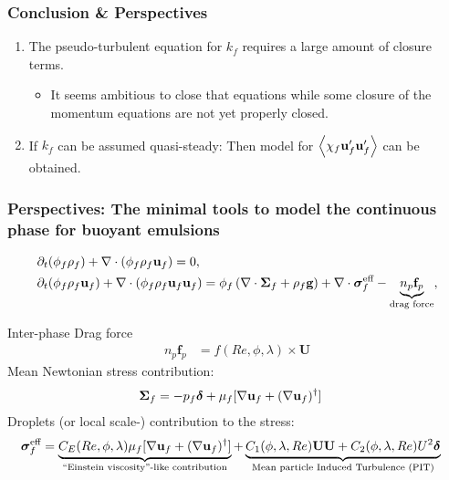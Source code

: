 \documentclass{sintefbeamer}
\begin{document}
\begin{frame}
  \frametitle{Conclusion \& Perspectives}

  \begin{enumerate}
    \item The pseudo-turbulent equation for $k_f$ requires a large amount of closure terms. 
    \begin{itemize}
      \item 
      It seems ambitious to close that equations while some closure of the momentum equations are not yet properly closed. 
    \end{itemize}
    \item If $k_f$ can be assumed quasi-steady: Then model for $\left<\chi_f\textbf{u}_f'\textbf{u}_f'\right>$ can be obtained. 
  \end{enumerate}

\end{frame}

\begin{frame}
  \frametitle{Perspectives: The minimal tools to model the continuous phase for buoyant emulsions}


  \begin{align*}
    &\partial_t (\phi_f \rho_f)  
    + \mathbf{\nabla}\cdot (
        \phi_f \rho_f\textbf{u}_f
    )
    = 
    0,\\
    &\partial_t (\phi_f\rho_f \textbf{u}_f)
    + \mathbf{\nabla}\cdot (\phi_f\rho_f \textbf{u}_f\textbf{u}_f)
    = \phi_f 
    \left(\mathbf{\nabla}\cdot \bm{\Sigma}_f
    + \rho_f \textbf{g}\right)
    + \mathbf{\nabla}\cdot  \bm{\sigma}_f^{\text{eff}}
    - \underbrace{n_p \textbf{f}_p}_\text{drag force},
  \end{align*}
  \pause
  
Inter-phase Drag force 
  \begin{align*}
    n_p \textbf{f}_p  
    &= 
    f(Re,\phi, \lambda) \times \textbf{U}
  \end{align*}
Mean Newtonian stress contribution: 
\begin{align*}
  \bm\Sigma_f &= - p_f \bm\delta + \mu_f [\mathbf{\nabla} \textbf{u}_f +  (\mathbf{\nabla} \textbf{u}_f)^\dagger ] 
\end{align*}
Droplets  (or local scale-)  contribution to the stress:
\begin{align*}
    \bm{\sigma}^{\text{eff}}_f 
    &= \underbrace{C_E(Re,\phi,\lambda) \mu_f [\mathbf{\nabla} \textbf{u}_f +  (\mathbf{\nabla} \textbf{u}_f)^\dagger ] }_\text{``Einstein viscosity''-like contribution}
    + 
    \underbrace{
      C_1(\phi,\lambda,Re)\textbf{UU}
    + C_2(\phi,\lambda,Re)U^2 \bm\delta}_\text{Mean particle Induced Turbulence (PIT)}
\end{align*}

\end{frame}
\backmatter
\end{document}
